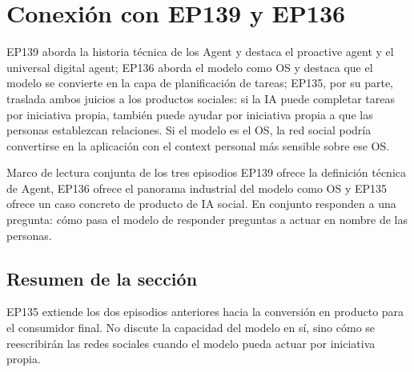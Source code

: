 \section{Conexión con EP139 y EP136}

EP139 aborda la historia técnica de los Agent y destaca el proactive agent y el universal digital agent; EP136 aborda el modelo como OS y destaca que el modelo se convierte en la capa de planificación de tareas; EP135, por su parte, traslada ambos juicios a los productos sociales: si la IA puede completar tareas por iniciativa propia, también puede ayudar por iniciativa propia a que las personas establezcan relaciones. Si el modelo es el OS, la red social podría convertirse en la aplicación con el context personal más sensible sobre ese OS.

\begin{knowledgebox}{Marco de lectura conjunta de los tres episodios}
EP139 ofrece la definición técnica de Agent, EP136 ofrece el panorama industrial del modelo como OS y EP135 ofrece un caso concreto de producto de IA social. En conjunto responden a una pregunta: cómo pasa el modelo de responder preguntas a actuar en nombre de las personas.
\end{knowledgebox}

\subsection{Resumen de la sección}

EP135 extiende los dos episodios anteriores hacia la conversión en producto para el consumidor final. No discute la capacidad del modelo en sí, sino cómo se reescribirán las redes sociales cuando el modelo pueda actuar por iniciativa propia.
